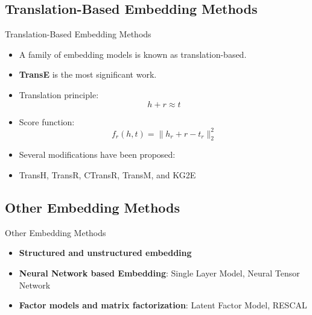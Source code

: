 \documentclass[xcolor={x11names,svgnames,dvipsnames},trans]{beamer}
\begin{document}
\subsection{Translation-Based Embedding Methods}
\begin{frame}{Translation-Based Embedding Methods}

    \begin{itemize}
        \item A family of embedding models is known as translation-based.
        \item \textbf{TransE} is the most significant work.
    \end{itemize}

    \begin{center}
        \begin{minipage}{.8\textwidth}\rmfamily
            \begin{itemize}
                \item Translation principle: $$ h + r \approx t$$
                \item Score function: $$ f_r(h, t) = \| h_r + r - t_r\|_2^2 $$
            \end{itemize}
        \end{minipage}
    \end{center}

    \begin{itemize}
        \item Several modifications have been proposed:
        \item TransH, TransR, CTransR, TransM, and KG2E
    \end{itemize}

\end{frame}

\subsection{Other Embedding Methods}
\begin{frame}{Other Embedding Methods}
    \begin{itemize}
        \item \textbf{Structured and unstructured embedding}
        \item \textbf{Neural Network based Embedding}: Single Layer Model, Neural Tensor Network
        \item \textbf{Factor models and matrix factorization}: Latent Factor Model, RESCAL
    \end{itemize}
\end{frame}
\end{document}
